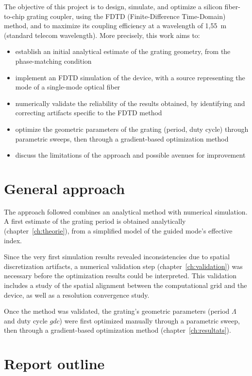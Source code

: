\documentclass[a4paper,11pt]{report}
\begin{document}
The objective of this project is to design, simulate, and optimize a silicon fiber-to-chip grating coupler, using the FDTD (Finite-Difference Time-Domain) method, and to maximize its coupling efficiency at a wavelength of 1{,}55~\textmu m (standard telecom wavelength). More precisely, this work aims to:

\begin{itemize}
    \item establish an initial analytical estimate of the grating geometry, from the phase-matching condition 
    \item implement an FDTD simulation of the device, with a source representing the mode of a single-mode optical fiber 
    \item numerically validate the reliability of the results obtained, by identifying and correcting artifacts specific to the FDTD method 
    \item optimize the geometric parameters of the grating (period, duty cycle) through parametric sweeps, then through a gradient-based optimization method 
    \item discuss the limitations of the approach and possible avenues for improvement
\end{itemize}

\section{General approach}

The approach followed combines an analytical method with numerical simulation. A first estimate of the grating period is obtained analytically (chapter~\ref{ch:theorie}), from a simplified model of the guided mode's effective index. 

Since the very first simulation results revealed inconsistencies due to spatial discretization artifacts, a numerical validation step (chapter~\ref{ch:validation}) was necessary before the optimization results could be interpreted. This validation includes a study of the spatial alignment between the computational grid and the device, as well as a resolution convergence study.

Once the method was validated, the grating's geometric parameters (period $\Lambda$ and duty cycle $gdc$) were first optimized manually through a parametric sweep, then through a gradient-based optimization method (chapter~\ref{ch:resultats}).

\section{Report outline}
\end{document}
